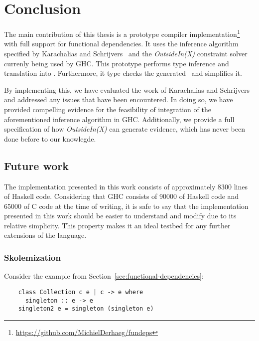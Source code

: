 \chapter{Conclusion}
\label{cha:conclusion}

The main contribution of this thesis is a prototype compiler
implementation\footnote{\url{https://github.com/MichielDerhaeg/fundeps}} with
full support for functional dependencies. It uses the inference algorithm
specified by Karachalias and
Schrijvers~\cite{Karachalias:2017:EFD:3156695.3122966} and the
\textit{OutsideIn(X)}\cite{outsideinx-modular-type-inference-with-local-assumptions}
constraint solver currenly being used by GHC.  This prototype performs type
inference and translation into \systemfc. Furthermore, it type checks the
generated \systemfc ~and simplifies it.

By implementing this, we have evaluated the work of Karachalias and
Schrijvers~\cite{Karachalias:2017:EFD:3156695.3122966} and addressed any issues
that have been encountered. In doing so, we have provided compelling evidence
for the feasibility of integration of the aforementioned inference algorithm in
GHC. Additionally, we provide a full specification of how \textit{OutsideIn(X)}
can generate evidence, which has never been done before to our knowlegde.

\section{Future work}

The implementation presented in this work consists of approximately 8300 lines
of Haskell code. Considering that GHC consists of 90000 of Haskell code and
65000 of C code at the time of writing, it is safe to say that the
implementation presented in this work should be easier to understand and modify
due to its relative simplicity. This property makes it an ideal testbed for
any further extensions of the language.

\subsection{Skolemization}

Consider the example from Section~\ref{sec:functional-dependencies}:
\begin{verbatim}
    class Collection c e | c -> e where
      singleton :: e -> e
    singleton2 e = singleton (singleton e)
\end{verbatim}

